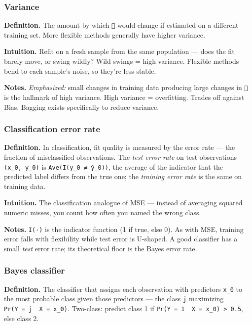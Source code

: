 \documentclass[
  10pt,
  letterpaper,
  onecolumn]{article}
\begin{document}
\hypertarget{variance}{%
\subsubsection{Variance}\label{variance}}

\textbf{Definition.} The amount by which \texttt{} would change if
estimated on a different training set. More flexible methods generally
have higher variance.

\textbf{Intuition.} Refit on a fresh sample from the same population ---
does the fit barely move, or swing wildly? Wild swings = high variance.
Flexible methods bend to each sample's noise, so they're less stable.

\textbf{Notes.} \emph{Emphasized:} small changes in training data
producing large changes in \texttt{} is the hallmark of high variance.
High variance = overfitting. Trades off against Bias. Bagging exists
specifically to reduce variance.

\hypertarget{classification-error-rate}{%
\subsubsection{Classification error
rate}\label{classification-error-rate}}

\textbf{Definition.} In classification, fit quality is measured by the
error rate --- the fraction of misclassified observations. The
\emph{test error rate} on test observations \texttt{(x\_0,\ y\_0)} is
\texttt{Ave(I(y\_0\ ≠\ ŷ\_0))}, the average of the indicator that the
predicted label differs from the true one; the \emph{training error
rate} is the same on training data.

\textbf{Intuition.} The classification analogue of MSE --- instead of
averaging squared numeric misses, you count how often you named the
wrong class.

\textbf{Notes.} \texttt{I(·)} is the indicator function (1 if true, else
0). As with MSE, training error falls with flexibility while test error
is U-shaped. A good classifier has a small \emph{test} error rate; its
theoretical floor is the Bayes error rate.

\hypertarget{bayes-classifier}{%
\subsubsection{Bayes classifier}\label{bayes-classifier}}

\textbf{Definition.} The classifier that assigns each observation with
predictors \texttt{x\_0} to the most probable class given those
predictors --- the class \texttt{j} maximizing
\texttt{Pr(Y\ =\ j\ \textbar{}\ X\ =\ x\_0)}. Two-class: predict class 1
if \texttt{Pr(Y\ =\ 1\ \textbar{}\ X\ =\ x\_0)\ \textgreater{}\ 0.5},
else class 2.
\end{document}
